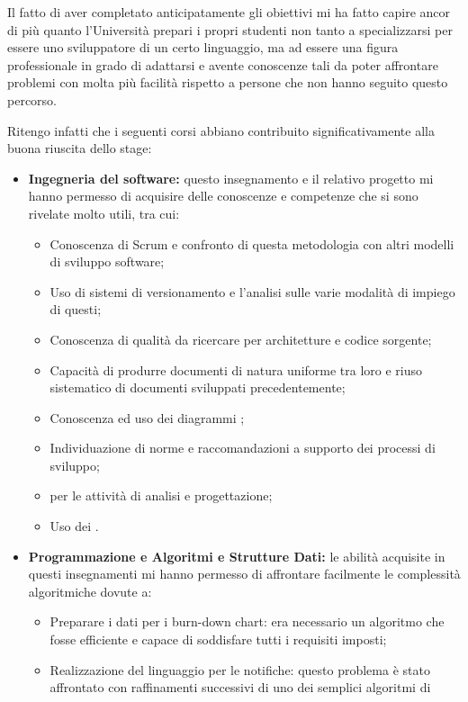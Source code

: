 Il fatto di aver completato anticipatamente gli obiettivi mi ha fatto capire
ancor di più quanto l'Università prepari i propri studenti non tanto a
specializzarsi per essere uno sviluppatore di un certo linguaggio, ma ad
essere una figura professionale in grado di adattarsi e avente conoscenze tali
da poter affrontare problemi con molta più facilità rispetto a persone che non
hanno seguito questo percorso.

Ritengo infatti che i seguenti corsi abbiano contribuito significativamente
alla buona riuscita dello stage:

\begin{itemize}
\item \textbf{Ingegneria del software:} questo insegnamento e il relativo
  progetto mi hanno permesso di acquisire delle conoscenze e competenze che si
  sono rivelate molto utili, tra cui:
  \begin{itemize}
  \item Conoscenza di Scrum e confronto di questa metodologia con altri modelli
    di sviluppo software;
  \item Uso di sistemi di versionamento e l'analisi sulle varie modalità di
    impiego di questi;
  \item Conoscenza di qualità da ricercare per architetture e codice sorgente;
  \item Capacità di produrre documenti di natura uniforme tra loro e riuso
    sistematico di documenti sviluppati precedentemente;
  \item Conoscenza ed uso dei diagrammi ;
  \item Individuazione di norme e raccomandazioni a supporto dei processi di
    sviluppo;
  \item {} per le attività di analisi e progettazione;
  \item Uso dei .
  \end{itemize}
\item \textbf{Programmazione e Algoritmi e Strutture Dati:} le abilità
  acquisite in questi insegnamenti mi hanno permesso di affrontare facilmente
  le complessità algoritmiche dovute a:
  \begin{itemize}
  \item Preparare i dati per i burn-down chart: era necessario un algoritmo che
    fosse efficiente e capace di soddisfare tutti i requisiti imposti;
  \item Realizzazione del linguaggio per le notifiche: questo problema è stato
    affrontato con raffinamenti successivi di uno dei semplici algoritmi di

\end{itemize}
\end{itemize}
